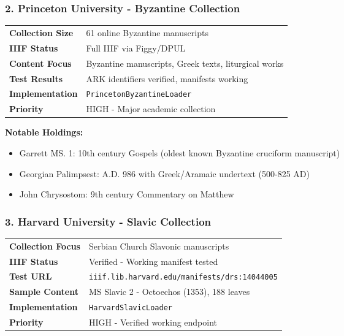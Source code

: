 \documentclass[11pt,a4paper]{article}
\begin{document}
\subsubsection{2. Princeton University - Byzantine Collection}

\begin{tabularx}{\textwidth}{lX}
\toprule
\textbf{Collection Size} & 61 online Byzantine manuscripts \\
\textbf{IIIF Status} & \textcolor{success}{\faBolt{} Full IIIF} via Figgy/DPUL \\
\textbf{Content Focus} & Byzantine manuscripts, Greek texts, liturgical works \\
\textbf{Test Results} & ARK identifiers verified, manifests working \\
\textbf{Implementation} & \texttt{PrincetonByzantineLoader} \\
\textbf{Priority} & \textcolor{success}{\faStar{} HIGH} - Major academic collection \\
\bottomrule
\end{tabularx}

\vspace{0.5cm}

\textbf{Notable Holdings:}
\begin{itemize}[leftmargin=*,noitemsep]
    \item Garrett MS. 1: 10th century Gospels (oldest known Byzantine cruciform manuscript)
    \item Georgian Palimpsest: A.D. 986 with Greek/Aramaic undertext (500-825 AD)
    \item John Chrysostom: 9th century Commentary on Matthew
\end{itemize}

\subsubsection{3. Harvard University - Slavic Collection}

\begin{tabularx}{\textwidth}{lX}
\toprule
\textbf{Collection Focus} & Serbian Church Slavonic manuscripts \\
\textbf{IIIF Status} & \textcolor{success}{\faBolt{} Verified} - Working manifest tested \\
\textbf{Test URL} & \texttt{iiif.lib.harvard.edu/manifests/drs:14044005} \\
\textbf{Sample Content} & MS Slavic 2 - Octoechos (1353), 188 leaves \\
\textbf{Implementation} & \texttt{HarvardSlavicLoader} \\
\textbf{Priority} & \textcolor{success}{\faStar{} HIGH} - Verified working endpoint \\
\bottomrule
\end{tabularx}
\end{document}
